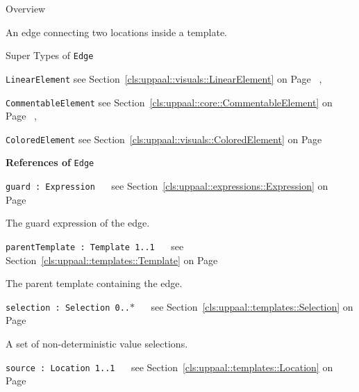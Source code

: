 	\begin{longdescription}
		\item[Overview] 		
				

	

		An edge connecting two locations inside a template.		
		\item[Super Types of \texttt{Edge}] ~
			\begin{longdescription}
				\item[\texttt{LinearElement}] see Section~\ref{cls:uppaal::visuals::LinearElement} on Page~\pageref{cls:uppaal::visuals::LinearElement}			, 				\item[\texttt{CommentableElement}] see Section~\ref{cls:uppaal::core::CommentableElement} on Page~\pageref{cls:uppaal::core::CommentableElement}			, 				\item[\texttt{ColoredElement}] see Section~\ref{cls:uppaal::visuals::ColoredElement} on Page~\pageref{cls:uppaal::visuals::ColoredElement}						\end{longdescription}
		
	
			\item[\textbf{References of} \texttt{Edge}] ~
			\begin{longdescription}
	\item[\texttt{guard : Expression 	}] ~
	see Section~\ref{cls:uppaal::expressions::Expression} on Page~\pageref{cls:uppaal::expressions::Expression}
	
	\nopagebreak
		
				

	

		The guard expression of the edge.		
	\item[\texttt{parentTemplate : Template 	\symbol{"5B}1..1\symbol{"5D}
}] ~
	see Section~\ref{cls:uppaal::templates::Template} on Page~\pageref{cls:uppaal::templates::Template}
	
	\nopagebreak
		
				

	

		The parent template containing the edge.		
	\item[\texttt{selection : Selection 	\symbol{"5B}0..$*$\symbol{"5D}
}] ~
	see Section~\ref{cls:uppaal::templates::Selection} on Page~\pageref{cls:uppaal::templates::Selection}
	
	\nopagebreak
		
				

	

		A set of non-deterministic value selections.		
	\item[\texttt{source : Location 	\symbol{"5B}1..1\symbol{"5D}
}] ~
	see Section~\ref{cls:uppaal::templates::Location} on Page~\pageref{cls:uppaal::templates::Location}
	

\end{longdescription}
\end{longdescription}
